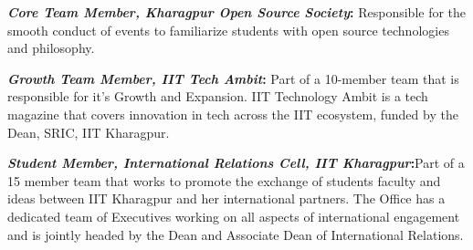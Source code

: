 \documentclass[]{deedy-resume-openfont}
\begin{document}
\begin{minipage}[t]{0.66\textwidth}
\begin{tightemize}
\item \textbf{{\emph{Core Team Member, Kharagpur Open Source Society}:}} Responsible for the smooth conduct of events to familiarize students with open source technologies and philosophy.
\vspace{\topsep} %
\item \textbf{{\emph{Growth Team Member, IIT Tech Ambit}:}} Part of a 10-member team that is responsible for it’s Growth and Expansion. IIT Technology Ambit is a tech magazine that covers innovation in tech across the IIT ecosystem, funded by the Dean, SRIC, IIT Kharagpur.
\vspace{\topsep} %
\item\textbf{{\emph{Student Member, International Relations Cell, IIT Kharagpur}:}}Part of a 15 member team that works to promote the exchange of students faculty and ideas between IIT Kharagpur and her international partners. The Office has a dedicated team of Executives working on all aspects of international engagement and is jointly headed by the Dean and Associate Dean of International Relations. 

\end{tightemize}
\sectionsep

\end{minipage} 
\end{document}

